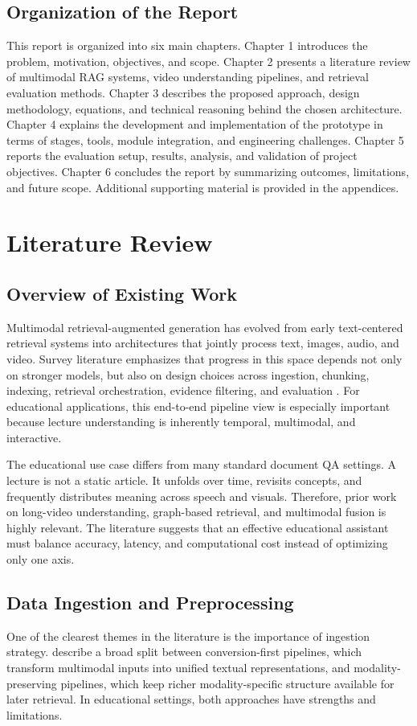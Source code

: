 \documentclass[12pt,a4paper,oneside]{report}
\begin{document}
\section{Organization of the Report}
This report is organized into six main chapters. Chapter 1 introduces the problem, motivation, objectives, and scope. Chapter 2 presents a literature review of multimodal RAG systems, video understanding pipelines, and retrieval evaluation methods. Chapter 3 describes the proposed approach, design methodology, equations, and technical reasoning behind the chosen architecture. Chapter 4 explains the development and implementation of the prototype in terms of stages, tools, module integration, and engineering challenges. Chapter 5 reports the evaluation setup, results, analysis, and validation of project objectives. Chapter 6 concludes the report by summarizing outcomes, limitations, and future scope. Additional supporting material is provided in the appendices.

\chapter{Literature Review}

\section{Overview of Existing Work}
Multimodal retrieval-augmented generation has evolved from early text-centered retrieval systems into architectures that jointly process text, images, audio, and video. Survey literature emphasizes that progress in this space depends not only on stronger models, but also on design choices across ingestion, chunking, indexing, retrieval orchestration, evidence filtering, and evaluation \cite{mei2024survey,brown2024systematic}. For educational applications, this end-to-end pipeline view is especially important because lecture understanding is inherently temporal, multimodal, and interactive.

The educational use case differs from many standard document QA settings. A lecture is not a static article. It unfolds over time, revisits concepts, and frequently distributes meaning across speech and visuals. Therefore, prior work on long-video understanding, graph-based retrieval, and multimodal fusion is highly relevant. The literature suggests that an effective educational assistant must balance accuracy, latency, and computational cost instead of optimizing only one axis.

\section{Data Ingestion and Preprocessing}
One of the clearest themes in the literature is the importance of ingestion strategy. \citet{mei2024survey} describe a broad split between conversion-first pipelines, which transform multimodal inputs into unified textual representations, and modality-preserving pipelines, which keep richer modality-specific structure available for later retrieval. In educational settings, both approaches have strengths and limitations.
\end{document}
